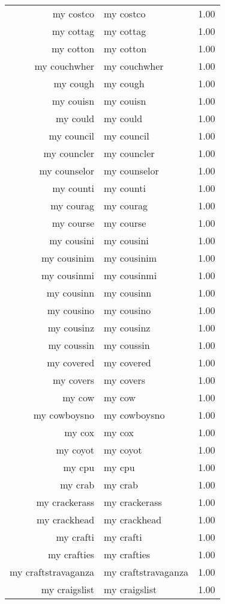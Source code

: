 \begin{table}[ht]
\begin{tabular}{rlr}
  my costco & my costco & 1.00 \\ 
  my cottag & my cottag & 1.00 \\ 
  my cotton & my cotton & 1.00 \\ 
  my couchwher & my couchwher & 1.00 \\ 
  my cough & my cough & 1.00 \\ 
  my couisn & my couisn & 1.00 \\ 
  my could & my could & 1.00 \\ 
  my council & my council & 1.00 \\ 
  my councler & my councler & 1.00 \\ 
  my counselor & my counselor & 1.00 \\ 
  my counti & my counti & 1.00 \\ 
  my courag & my courag & 1.00 \\ 
  my course & my course & 1.00 \\ 
  my cousini & my cousini & 1.00 \\ 
  my cousinim & my cousinim & 1.00 \\ 
  my cousinmi & my cousinmi & 1.00 \\ 
  my cousinn & my cousinn & 1.00 \\ 
  my cousino & my cousino & 1.00 \\ 
  my cousinz & my cousinz & 1.00 \\ 
  my coussin & my coussin & 1.00 \\ 
  my covered & my covered & 1.00 \\ 
  my covers & my covers & 1.00 \\ 
  my cow & my cow & 1.00 \\ 
  my cowboysno & my cowboysno & 1.00 \\ 
  my cox & my cox & 1.00 \\ 
  my coyot & my coyot & 1.00 \\ 
  my cpu & my cpu & 1.00 \\ 
  my crab & my crab & 1.00 \\ 
  my crackerass & my crackerass & 1.00 \\ 
  my crackhead & my crackhead & 1.00 \\ 
  my crafti & my crafti & 1.00 \\ 
  my crafties & my crafties & 1.00 \\ 
  my craftstravaganza & my craftstravaganza & 1.00 \\ 
  my craigslist & my craigslist & 1.00 \\ 

\end{tabular}
\end{table}
